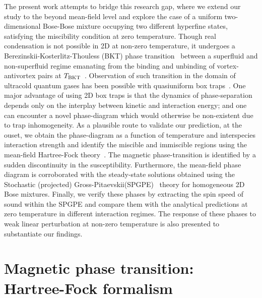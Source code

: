 \documentclass[pra,twocolumn,aps,showpacs,longbibliography]{revtex4-1}
\begin{document}
The present work attempts to bridge this research gap, where we extend our study to the beyond mean-field level 
and explore the case of a uniform two-dimensional Bose-Bose mixture occupying two 
different hyperfine states, satisfying the miscibility condition at zero temperature.
Though real condensation is not possible in 2D at non-zero temperature, it undergoes a 
Berezinskii-Kosterlitz-Thouless (BKT) phase transition~\cite{berezinskii_72,kosterlitz_72,kosterlitz_73,kosterlitz_16} between a superfluid
and non-superfluid regime emanating from the binding and unbinding of vortex-antivortex pairs at $T_{\rm BKT}$~\cite{prokofev_01}.
Observation of such transition in the domain of ultracold quantum gases has been possible with 
quasiuniform box traps~\cite{gaunt_13,chomaz_15}. One major advantage of using 2D box traps is that the dynamics
of phase-separation depends only on the interplay between kinetic and interaction energy; and one
can encounter a novel phase-diagram which would otherwise be non-existent due to trap inhomogeneity. As a plausible route
to validate our prediction, at the ouset, we obtain the phase-diagram
as a function of temperature and interspecies interaction strength and identify the miscible
and immiscible regions using the mean-field Hartree-Fock theory~\cite{ohberg_98,shi_2000}. The magnetic phase-transition is identified
by  a sudden discontinuity in the susceptibility. 
Furthermore, the mean-field phase diagram is corroborated with the steady-state solutions obtained using the Stochastic (projected) 
Gross-Pitaevskii(SPGPE)~\cite{blakie_08,proukakis_08} theory for homogeneous 2D Bose mixtures.
Finally, we verify these phases by extracting the spin speed of sound within the SPGPE and compare them
with the analytical predictions at zero temperature in different interaction regimes. The response of these phases
to weak linear perturbation at non-zero temperature is also presented to substantiate our findings.

 



\section{Magnetic phase transition: Hartree-Fock formalism}
\end{document}

